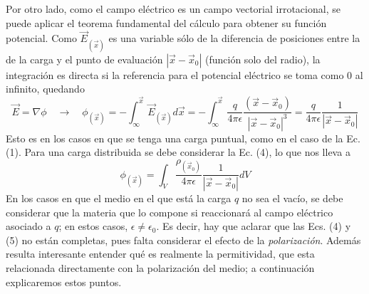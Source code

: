 \documentclass[12pt, notitlepage]{article}
\begin{document}
Por otro lado, como el campo eléctrico es un campo vectorial irrotacional, se puede aplicar el teorema fundamental del cálculo para obtener su función potencial. Como $\vec{E}_{(\vec{x})}$ es una variable sólo de la diferencia de posiciones entre la de la carga y el punto de evaluación $|\vec{x} - \vec{x}_0|$ (función solo del radio), la integración es directa si la referencia para el potencial eléctrico se toma como $0$ al infinito, quedando
\begin{equation}
 \vec{E} = \nabla\phi \quad\rightarrow\quad\phi_{(\vec{x})} = -\int_\infty^{\vec{x}} \vec{E}_{(\vec{x})} d\vec{x} = -\int_\infty^{\vec{x}} \frac{q}{4\pi\epsilon}\frac{(\vec{x}-\vec{x}_0)}{|\vec{x} - \vec{x}_0|^3} = \frac{q}{4\pi\epsilon}\frac{1}{|\vec{x} - \vec{x}_0|}
\end{equation}
Esto es en los casos en que se tenga una carga puntual, como en el caso de la Ec. (1). Para una carga distribuida se debe considerar la Ec. (4), lo que nos lleva a
\begin{equation}
\phi_{(\vec{x})} = \int_V \frac{\rho_{(\vec{x}_0)}}{4\pi\epsilon}\frac{1}{|\vec{x}-\vec{x}_0|}dV
\end{equation}
En los casos en que el medio en el que está la carga $q$ no sea el vacío, se debe considerar que la materia que lo compone si reaccionará al campo eléctrico asociado a $q$; en estos casos, $\epsilon \neq \epsilon_0$. Es decir, hay que aclarar que las Ecs. (4) y (5) no están completas, pues falta considerar el efecto de la \textit{polarización}. Además resulta interesante entender qué es realmente la permitividad, que esta relacionada directamente con la polarización del medio; a continuación explicaremos estos puntos.
\end{document}
